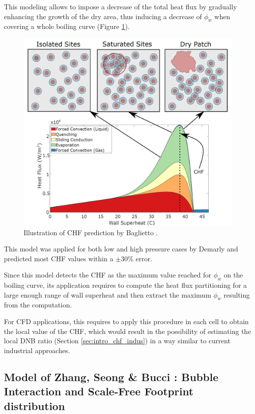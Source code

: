 This modeling allows to impose a decrease of the total heat flux by gradually enhancing the growth of the dry area, thus inducing a decrease of $\phi_{w}$ when covering a whole boiling curve (Figure \ref{fig:chf_baglietto}).

\begin{figure}[!h]
\centering
\includegraphics[width=0.6\linewidth]{img/chf/chf_baglietto.png}
\caption{Illustration of CHF prediction by Baglietto \etal \cite{baglietto_boiling_2019}.}
\label{fig:chf_baglietto}
\end{figure}

This model was applied for both low and high pressure cases by Demarly \cite{demarly_new_2020} and predicted most CHF values within a $\pm 30\%$ error.

\begin{remark*}{}
Since this model detects the CHF as the maximum value reached for $\phi_{w}$ on the boiling curve, its application requires to compute the heat flux partitioning for a large enough range of wall superheat and then extract the maximum $\phi_{w}$ resulting from the computation. 

\npar

For CFD applications, this requires to apply this procedure in each cell to obtain the local value of the CHF, which would result in the possibility of estimating the local DNB ratio (Section \ref{sec:intro_chf_indus}) in a way similar to current industrial approaches.
\end{remark*}



\subsection{Model of Zhang, Seong \& Bucci \cite{zhang_percolative_2019}:  Bubble Interaction and Scale-Free Footprint distribution}



